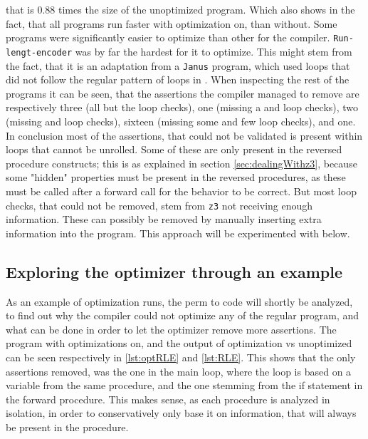 that is $0.88$ times the size of the unoptimized program.
Which also shows in the fact, that all programs run faster with
optimization on, than without. Some programs were significantly easier to optimize than other
for the \lan compiler. \texttt{Run-lengt-encoder} was by far the hardest for it to optimize.
This might stem from the fact, that it is an adaptation from a \texttt{Janus} program, which
used  loops that did not follow the regular pattern of  loops in \lan.
When inspecting the rest of the programs it can be seen, that the assertions the \lan compiler
managed to remove are respectively three (all but the loop checks), one (missing a 
and loop checks),
two (missing  and loop checks), sixteen (missing some  and few loop checks),
and one. In conclusion most of the assertions, that could not be validated is present within
loops that cannot be unrolled. Some of these are only present in the reversed procedure constructs;
this is as explained in section \ref{sec:dealingWithz3}, because
some "hidden" properties must be present in the reversed procedures, as these must be called after
a forward call for the behavior to be correct. But most loop checks, that could not be removed,
stem from \texttt{z3} not receiving enough information. These can possibly be removed by manually
inserting extra information into the program. This approach will be experimented with below.

\subsection{Exploring the optimizer through an example}
As an example of optimization runs, the perm to code will shortly be analyzed, to find
out why the \lan compiler could not optimize any of the regular program, and what can be done
in order to let the optimizer remove more assertions. The program with optimizations on, and the
 output of optimization vs unoptimized can be seen respectively in
\autoref{lst:optRLE} and \autoref{lst:RLE}. This shows that the only assertions removed, was
the one in the main loop, where the loop is based on a variable from the same procedure, and
the one stemming from the if statement in the forward procedure.
This makes sense, as each procedure is analyzed in isolation, in order to conservatively only
base it on information, that will always be present in the procedure.

